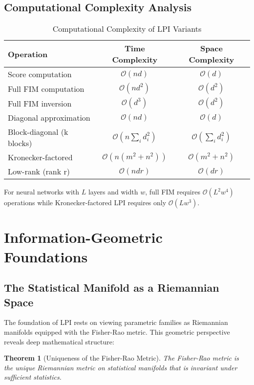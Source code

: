 \documentclass[11pt]{article}
\newtheorem{theorem}{Theorem}
\begin{document}
\subsection{Computational Complexity Analysis}

\begin{table}[h]
\centering
\caption{Computational Complexity of LPI Variants}
\begin{tabular}{lcc}
\toprule
\textbf{Operation} & \textbf{Time Complexity} & \textbf{Space Complexity} \\
\midrule
Score computation & $\mathcal{O}(nd)$ & $\mathcal{O}(d)$ \\
Full FIM computation & $\mathcal{O}(nd^2)$ & $\mathcal{O}(d^2)$ \\
Full FIM inversion & $\mathcal{O}(d^3)$ & $\mathcal{O}(d^2)$ \\
\midrule
Diagonal approximation & $\mathcal{O}(nd)$ & $\mathcal{O}(d)$ \\
Block-diagonal (k blocks) & $\mathcal{O}(n\sum_i d_i^2)$ & $\mathcal{O}(\sum_i d_i^2)$ \\
Kronecker-factored & $\mathcal{O}(n(m^2 + n^2))$ & $\mathcal{O}(m^2 + n^2)$ \\
Low-rank (rank r) & $\mathcal{O}(ndr)$ & $\mathcal{O}(dr)$ \\
\bottomrule
\end{tabular}
\end{table}

For neural networks with $L$ layers and width $w$, full FIM requires $\mathcal{O}(L^2w^4)$ operations while Kronecker-factored LPI requires only $\mathcal{O}(Lw^3)$.

\section{Information-Geometric Foundations}

\subsection{The Statistical Manifold as a Riemannian Space}

The foundation of LPI rests on viewing parametric families as Riemannian manifolds equipped with the Fisher-Rao metric. This geometric perspective reveals deep mathematical structure:

\begin{theorem}[Uniqueness of the Fisher-Rao Metric]
\label{thm:fisher_rao_unique}
The Fisher-Rao metric is the unique Riemannian metric on statistical manifolds that is invariant under sufficient statistics.
\end{theorem}
\end{document}
